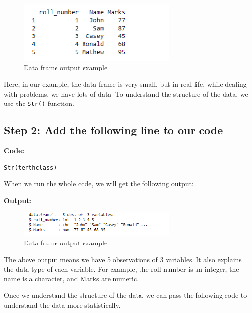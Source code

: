 \documentclass[12pt]{book}
\begin{document}
\begin{figure}[h]
    \begin{flushleft}
        \includegraphics[width=0.7\textwidth]{Data-Frames-in-R-1-1.png} %
        \caption{Data frame output example}
        \label{fig:dataframe}
    \end{flushleft}
\end{figure}
Here, in our example, the data frame is very small, but in real life, while dealing with problems, we have lots of data. To understand the structure of the data, we use the \texttt{Str()} function.

\subsection{Step 2: Add the following line to our code}

\textbf{Code:}
\begin{verbatim}
Str(tenthclass)
\end{verbatim}

When we run the whole code, we will get the following output:

\textbf{Output:}
\begin{figure}[h]
    \begin{flushleft}
        \includegraphics[width=0.7\textwidth]{Data-Frames-in-R-1-2.png} %
        \caption{Data frame output example}
        \label{fig:dataframe}
    \end{flushleft}
\end{figure}

The above output means we have 5 observations of 3 variables. It also explains the data type of each variable. For example, the roll number is an integer, the name is a character, and Marks are numeric.

Once we understand the structure of the data, we can pass the following code to understand the data more statistically.
\end{document}
